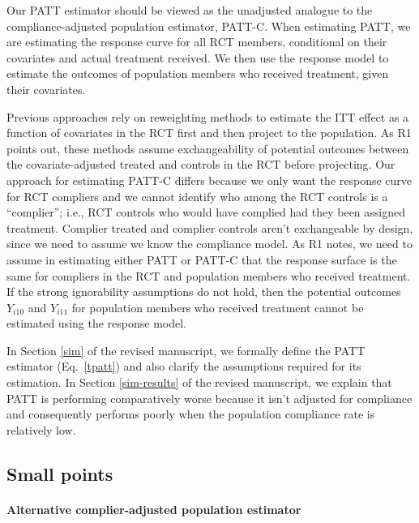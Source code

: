 \documentclass[hidelinks,12pt,letterpaper]{article}
\begin{document}
Our PATT estimator should be viewed as the unadjusted analogue to the compliance-adjusted population estimator, PATT-C. When estimating PATT, we are estimating the response curve for all RCT members, conditional on their covariates and actual treatment received. We then use the response model to estimate the outcomes of population members who received treatment, given their covariates. 

Previous approaches rely on reweighting methods to estimate the ITT effect as a function of covariates in the RCT first and then project to the population. As R1 points out, these methods assume exchangeability of potential outcomes between the covariate-adjusted treated and controls in the RCT before projecting. Our approach for estimating PATT-C differs because we only want the response curve for RCT compliers and we cannot identify who among the RCT controls is a ``complier''; i.e., RCT controls who would have complied had they been assigned treatment. Complier treated and complier controls aren't exchangeable by design, since we need to assume we know the compliance model. As R1 notes, we need to assume in estimating either PATT or PATT-C that the response surface is the same for compliers in the RCT and population members who received treatment. If the strong ignorability assumptions do not hold, then the potential outcomes $Y_{i10}$ and $Y_{i11}$ for population members who received treatment cannot be estimated using the response model.

In Section \ref{sim} of the revised manuscript, we formally define the PATT estimator (Eq.~\eqref{tpatt}) and also clarify the assumptions required for its estimation. In Section \ref{sim-results} of the revised manuscript, we explain that PATT is performing comparatively worse because it isn't adjusted for compliance and consequently performs poorly when the population compliance rate is relatively low.

\subsection{Small points}

\paragraph*{Alternative complier-adjusted population estimator}
\end{document}
